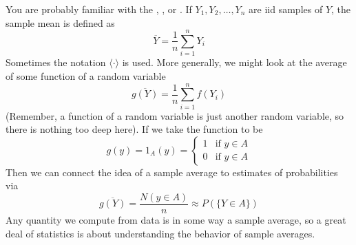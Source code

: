  You are probably familiar with the , , or . 
If $Y_1,Y_2,\dots,Y_n$ are iid samples of $Y$, the sample mean is defined as
\begin{equation*}
\overline{Y} = \frac{1}{n}\sum_{i=1}^nY_i
\end{equation*}
Sometimes the notation $\langle \cdot \rangle$ is used. 
More generally, we might look at the average of some function of a random variable 
\begin{equation*}
\overline{g(Y)} = \frac{1}{n}\sum_{i=1}^nf(Y_i)
\end{equation*}
(Remember, a function of a random variable is just another random variable, so there is nothing too deep here). 
If we take the function to be 
\begin{equation}
g(y) =1_A(y) =  \left\{\begin{array}{lr} 
1 & \text{if }y \in A\\
0 & \text{if }y \in A
\end{array}\right.
\end{equation}
Then we can connect the idea of a sample average to estimates of probabilities via
\begin{equation}
\overline{g(Y)} = \frac{N(y \in A)}{n} \approx P(\{Y \in A\})
\end{equation}
Any quantity we compute from data is in some way a sample average, so a great deal of statistics is about understanding the behavior of sample averages. 

